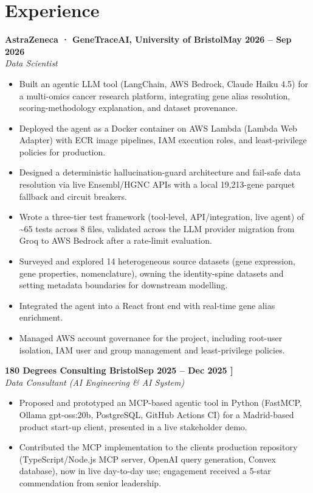 \documentclass[a4paper,11pt]{article}
\newcommand{\entry}[4]{\needspace{4\baselineskip}\noindent\textbf{#1}\hfill\textbf{#2}\\ \textit{#3}\hfill\textit{#4}\par}
\begin{document}
\section{Experience}
\entry{AstraZeneca · GeneTraceAI, University of Bristol}{May 2026 – Sep 2026}{Data Scientist}{}
\begin{itemize}
  \item Built an agentic LLM tool (LangChain, AWS Bedrock, Claude Haiku 4.5) for a multi-omics cancer research platform, integrating gene alias resolution, scoring-methodology explanation, and dataset provenance.
  \item Deployed the agent as a Docker container on AWS Lambda (Lambda Web Adapter) with ECR image pipelines, IAM execution roles, and least-privilege policies for production.
  \item Designed a deterministic hallucination-guard architecture and fail-safe data resolution via live Ensembl/HGNC APIs with a local 19,213-gene parquet fallback and circuit breakers.
  \item Wrote a three-tier test framework (tool-level, API/integration, live agent) of \textasciitilde{}65 tests across 8 files, validated across the LLM provider migration from Groq to AWS Bedrock after a rate-limit evaluation.
  \item Surveyed and explored 14 heterogeneous source datasets (gene expression, gene properties, nomenclature), owning the identity-spine datasets and setting metadata boundaries for downstream modelling.
  \item Integrated the agent into a React front end with real-time gene alias enrichment.
  \item Managed AWS account governance for the project, including root-user isolation, IAM user and group management and least-privilege policies.
\end{itemize}
\vspace{4pt}
\entry{180 Degrees Consulting Bristol}{Sep 2025 – Dec 2025   ]}{Data Consultant (AI Engineering \& AI System)}{}
\begin{itemize}
  \item Proposed and prototyped an MCP-based agentic tool in Python (FastMCP, Ollama gpt-oss:20b, PostgreSQL, GitHub Actions CI) for a Madrid-based product start-up client, presented in a live stakeholder demo.
  \item Contributed the MCP implementation to the client\textquotesingle{}s production repository (TypeScript/Node.js MCP server, OpenAI query generation, Convex database), now in live day-to-day use; engagement received a 5-star commendation from senior leadership.
\end{itemize}
\end{document}
